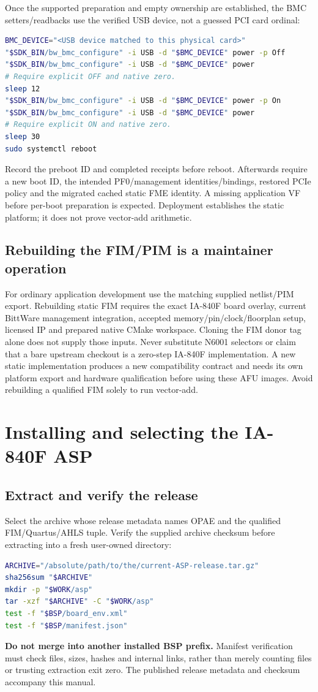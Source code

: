 \documentclass[11pt,letterpaper]{article}
\newcommand{\code}[1]{{\ttfamily\expandafter\seqsplit\expandafter{\detokenize{#1}}}}
\newcommand{\src}[1]{\cite{S#1}}
\newcommand{\chapterstart}[1]{\clearpage\section{#1}}
\begin{document}
Once the supported preparation and empty ownership are established, the BMC
setters/readbacks use the verified USB device, not a guessed PCI card ordinal:
\begin{lstlisting}[language=bash]
BMC_DEVICE="<USB device matched to this physical card>"
"$SDK_BIN/bw_bmc_configure" -i USB -d "$BMC_DEVICE" power -p Off
"$SDK_BIN/bw_bmc_configure" -i USB -d "$BMC_DEVICE" power
# Require explicit OFF and native zero.
sleep 12
"$SDK_BIN/bw_bmc_configure" -i USB -d "$BMC_DEVICE" power -p On
"$SDK_BIN/bw_bmc_configure" -i USB -d "$BMC_DEVICE" power
# Require explicit ON and native zero.
sleep 30
sudo systemctl reboot
\end{lstlisting}
Record the preboot ID and completed receipts before reboot. Afterwards require
a new boot ID, the intended PF0/management identities/bindings, restored PCIe
policy and the migrated cached static FME identity. A missing application VF
before per-boot preparation is expected. Deployment establishes the static
platform; it does not prove vector-add arithmetic.\src{9}

\subsection{Rebuilding the FIM/PIM is a maintainer operation}
For ordinary application development use the matching supplied netlist/PIM
export. Rebuilding static FIM requires the exact IA-840F board overlay, current
BittWare management integration, accepted memory/pin/clock/floorplan setup,
licensed IP and prepared native CMake workspace. Cloning the FIM donor tag
alone does not supply those inputs. Never substitute N6001 selectors or claim
that a bare upstream checkout is a zero-step IA-840F implementation.\src{7}
A new static implementation produces a new compatibility contract and needs
its own platform export and hardware qualification before using these AFU
images. Avoid rebuilding a qualified FIM solely to run vector-add.

\chapterstart{Installing and selecting the IA-840F ASP}
\label{sec:runtime}
\subsection{Extract and verify the release}
Select the archive whose release metadata names OPAE \code{2.14.0-3} and the
qualified FIM/Quartus/AHLS tuple. Verify the supplied archive checksum before
extracting into a fresh user-owned directory:
\begin{lstlisting}[language=bash]
ARCHIVE="/absolute/path/to/the/current-ASP-release.tar.gz"
sha256sum "$ARCHIVE"
mkdir -p "$WORK/asp"
tar -xzf "$ARCHIVE" -C "$WORK/asp"
test -f "$BSP/board_env.xml"
test -f "$BSP/manifest.json"
\end{lstlisting}
\textbf{Do not merge into another installed BSP prefix.} Manifest verification
must check files, sizes, hashes and internal links, rather than merely counting
files or trusting extraction exit zero. The published release metadata and
checksum accompany this manual.
\end{document}
